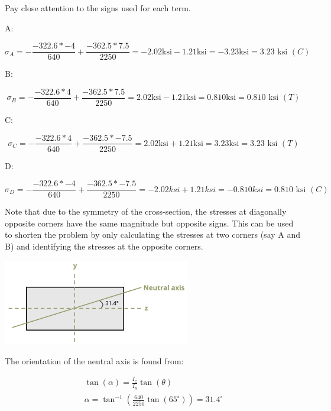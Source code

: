 \documentclass[
  letterpaper,
  DIV=11,
  numbers=noendperiod]{scrreprt}
\begin{document}
\begin{tcolorbox}
Pay close attention to the signs used for each term.

A:

\[
\sigma_A=-\frac{-322.6 *-4}{640}+\frac{-362.5 * 7.5}{2250}=-2.02 \mathrm{ksi}-1.21 \mathrm{ksi}=-3.23 \mathrm{ksi}=3.23 \text{ ksi }(C)
\]

B:

\[
\sigma_B=-\frac{-322.6 * 4}{640}+\frac{-362.5 * 7.5}{2250}=2.02 \mathrm{ksi}-1.21 \mathrm{ksi}=0.810 \mathrm{ksi}=0.810 \text{ ksi }(T)
\]

C:

\[
\sigma_C=-\frac{-322.6 * 4}{640}+\frac{-362.5 *-7.5}{2250}=2.02 \mathrm{ksi}+1.21 \mathrm{ksi}=3.23 \mathrm{ksi}=3.23 \text{ ksi }(T)
\]

D:

\[
\sigma_D=-\frac{-322.6 *-4}{640}+\frac{-362.5 *-7.5}{2250}=-2.02 k s i+1.21 k s i=-0.810 k s i=0.810 \text{ ksi }(C)
\]

Note that due to the symmetry of the cross-section, the stresses at
diagonally opposite corners have the same magnitude but opposite signs.
This can be used to shorten the problem by only calculating the stresses
at two corners (say A and B) and identifying the stresses at the
opposite corners.

\begin{center}
\includegraphics[width=3.20833in,height=\textheight]{images/CH9 PNGs/Example 9.5 part 2.png}
\end{center}

The orientation of the neutral axis is found from:

\[
\begin{gathered}
\tan (\alpha)=\frac{I_z}{I_y} \tan (\theta) \\
\alpha=\tan ^{-1}\left(\frac{640}{2250} \tan \left(65^{\circ}\right)\right)=31.4^{\circ}
\end{gathered}
\]

\end{tcolorbox}
\end{document}

